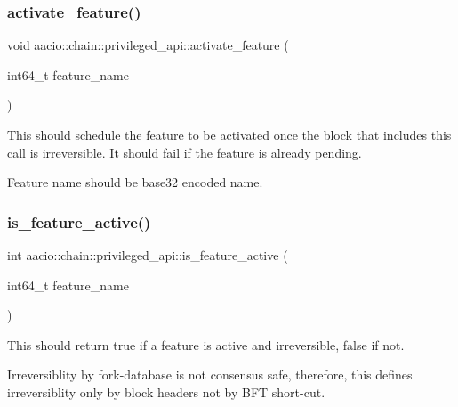 \subsubsection{\texorpdfstring{activate\+\_\+feature()}{activate\_feature()}}
{\footnotesize\ttfamily void aacio\+::chain\+::privileged\+\_\+api\+::activate\+\_\+feature (\begin{DoxyParamCaption}\item[{int64\+\_\+t}]{feature\+\_\+name }\end{DoxyParamCaption})\hspace{0.3cm}{\ttfamily [inline]}}

This should schedule the feature to be activated once the block that includes this call is irreversible. It should fail if the feature is already pending.

Feature name should be base32 encoded name. \mbox{\label{classaacio_1_1chain_1_1privileged__api_a25c4f854dca2c0574eddc099ad2c9a47}} 
\subsubsection{\texorpdfstring{is\+\_\+feature\+\_\+active()}{is\_feature\_active()}}
{\footnotesize\ttfamily int aacio\+::chain\+::privileged\+\_\+api\+::is\+\_\+feature\+\_\+active (\begin{DoxyParamCaption}\item[{int64\+\_\+t}]{feature\+\_\+name }\end{DoxyParamCaption})\hspace{0.3cm}{\ttfamily [inline]}}

This should return true if a feature is active and irreversible, false if not.

Irreversiblity by fork-\/database is not consensus safe, therefore, this defines irreversiblity only by block headers not by B\+FT short-\/cut. \mbox{\label{classaacio_1_1chain_1_1privileged__api_a80eb3cec42c4f385256580ccb5c473eb}} 
